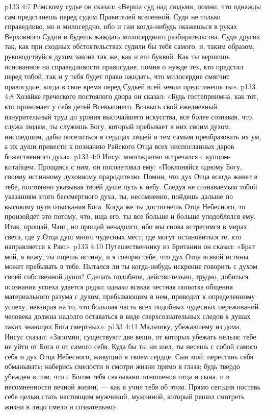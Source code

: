 \vs p133 4:7 \pc Римскому судье он сказал: «Верша суд над людьми, помни, что однажды сам предстанешь перед судом Правителей вселенной. Суди не только справедливо, но и милосердно, ибо и сам когда\hyp{}нибудь окажешься в руках Верховного Судии и будешь жаждать милосердного разбирательства. Суди других так, как при сходных обстоятельствах судили бы тебя самого, и, таким образом, руководствуйся духом закона так же, как и его буквой. Как ты вершишь основанное на справедливости правосудие, помня о нужде тех, кто предстал перед тобой, так и у тебя будет право ожидать, что милосердие смягчит правосудие, когда в свое время перед Судьей всей земли предстанешь ты».
\vs p133 4:8 \pc Хозяйке греческого постоялого двора он сказал: «Будь гостеприимна, как тот, кто принимает у себя детей Всевышнего. Возвысь свой ежедневный изнурительный труд до уровня высочайшего искусства, все более сознавая, что, служа людям, ты служишь Богу, который пребывает в них своим духом, нисшедшим, дабы поселиться в сердцах людей и тем самым преобразовать их ум, а их души привести к познанию Райского Отца всех ниспосланных даров божественного духа».
\vs p133 4:9 \pc Иисус многократно встречался с купцом\hyp{}китайцем. Прощаясь с ним, он посоветовал ему: «Поклоняйся одному Богу, своему истинному духовному прародителю. Помни, что дух Отца всегда живет в тебе, постоянно указывая твоей душе путь к небу. Следуя не сознаваемым тобой указаниям этого бессмертного духа, ты, несомненно, пойдешь дальше по высокому пути отыскания Бога. Когда же ты достигнешь Отца Небесного, то произойдет это потому, что, ища его, ты все больше и больше уподоблялся ему. Итак, прощай, Чанг, но прощай ненадолго, ибо мы снова встретимся в мирах света, где у Отца душ много чудесных мест, где могут остановиться те, кто направляется к Раю».
\vs p133 4:10 \pc Путешественнику из Британии он сказал: «Брат мой, я вижу, ты ищешь истину, и я говорю тебе, что дух Отца всякой истины может пребывать в тебе. Пытался ли ты когда\hyp{}нибудь искренне говорить с духом своей собственной души? Сделать подобное, действительно, трудно, добиться осознания успеха удается редко; однако всякая честная попытка общения материального разума с духом, пребывающим в нем, приводит к определенному успеху, невзирая на то, что большая часть всех подобных чудесных переживаний человека должна надолго оставаться в виде сверхсознательных следов в душах таких знающих Бога смертных».
\vs p133 4:11 \pc Мальчику, убежавшему из дома, Иисус сказал: «Запомни, существуют две вещи, от которых убежать нельзя: тебе не уйти от Бога и от самого себя. Куда бы ты ни шел, ты несешь с собой самого себя и дух Отца Небесного, живущий в твоем сердце. Сын мой, перестань себя обманывать; наберись смелости и смотри жизни прямо в глаза; будь твердо убежден в том, что с Богом тебя связывают отношения отца и сына, и в несомненности вечной жизни, --- как я учил тебя об этом. Прямо сегодня поставь себе целью стать настоящим мужчиной, мужчиной, который решил смотреть жизни в лицо смело и сознательно».
